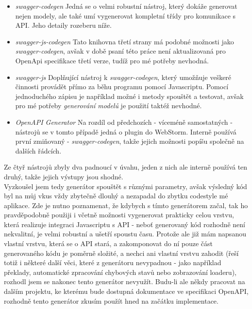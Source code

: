 \begin{itemize}
    \item \emph{swagger-codegen} \cite{swagger-codegen} Jedná se o velmi robustní nástroj, který dokáže generovat nejen modely, ale také umí vygenerovat kompletní třídy pro komunikace s API. Jeho detaily rozeberu níže.
    \item \emph{swagger-js-codegen} \cite{swagger-js-codegen} Tato knihovna třetí strany má podobné možnosti jako \emph{swagger-codegen}, avšak v době psaní této práce není aktualizovaná pro OpenApi specifikace třetí verze, tudíž pro mé potřeby nevhodná.
    \item \emph{swagger-js} \cite{swagger-js} Doplňující nástroj k \emph{swagger-codegen}, který umožňuje veškeré činnosti provádět přímo za běhu programu pomocí Javascriptu. Pomocí jednoduchého zápisu je například možné i metody spouštět a testovat, avšak pro mé potřeby \emph{generování modelů} je použití taktéž nevhodné.
    \item \emph{OpenAPI Generator} \cite{openapi-generator} Na rozdíl od předchozích - víceméně samostatných - nástrojů se v tomto případě jedná o plugin do WebStorm. Interně používá první zmiňovaný - \emph{swagger-codegen}, takže jejich možnosti popíšu společně na dalších řádcích.
\end{itemize}

Ze čtyř nástrojů zbyly dva padnoucí v úvahu, jeden z nich ale interně používá ten druhý, takže jejich výstupy jsou shodné.\\
Vyzkoušel jsem tedy generátor spouštět s různými parametry, avšak výsledný kód byl na můj vkus vždy zbytečně dlouhý a nezapadal do zbytku codestyle mé aplikace. Zde je nutno poznamenat, že kdybych s tímto generátorem začal, tak ho pravděpodobně použiji i včetně možnosti vygenerovat prakticky celou vrstvu, která realizuje integraci Javascriptu s API - neboť generovaný kód rozhodně není nekvalitní, je velmi robustní a ušetří spoustu času. Protože ale již mám napsanou vlastní vrstvu, která se o API stará, a zakomponovat do ní pouze část generovaného kódu je poměrně složité, a nechci ani vlastní vrstvu zahodit (řeší totiž i některé další věci, které z generátoru nevypadnou - jako například překlady, automatické zpracování chybových stavů nebo zobrazování loaderu), rozhodl jsem se nakonec tento generátor nevyužít. Budu-li ale někdy pracovat na dalším projektu, ke kterému bude dostupná dokumentace ve specifikaci OpenAPI, rozhodně tento generátor zkusím použít hned na začátku implementace.

